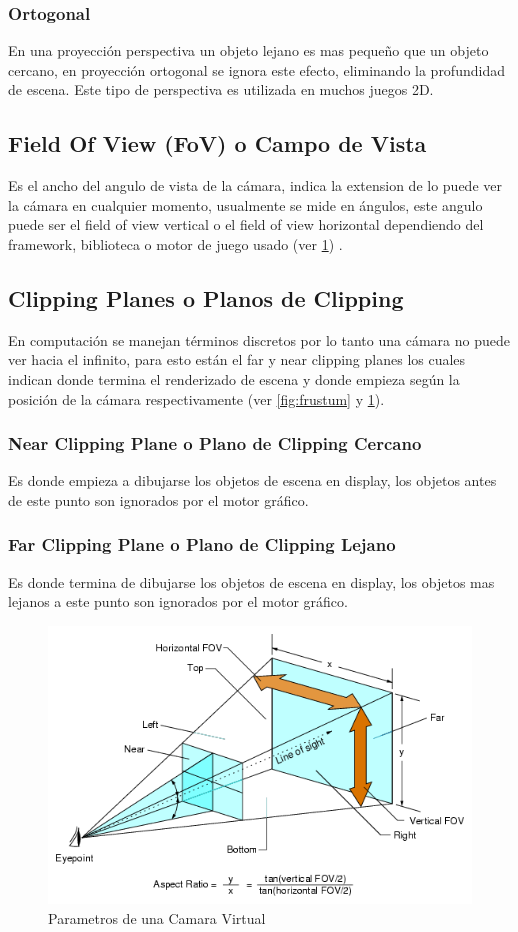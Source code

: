 \subsubsection{Ortogonal}
En una proyección perspectiva un objeto lejano es mas pequeño que un objeto cercano, en proyección ortogonal se ignora este efecto, eliminando la profundidad de escena. Este tipo de perspectiva es utilizada en muchos juegos 2D.
\subsection{Field Of View (FoV) o Campo de Vista}
Es el ancho del angulo de vista de la cámara, indica la extension de lo puede ver la cámara en cualquier momento, usualmente se mide en ángulos, este angulo puede ser el field of view vertical o el field of view horizontal dependiendo del framework, biblioteca o motor de juego usado (ver \ref{fig:camera}) \cite{feng_fovy}.
\subsection{Clipping Planes o Planos de Clipping}
En computación se manejan términos discretos por lo tanto una cámara no puede ver hacia el infinito, para esto están el far y near clipping planes los cuales indican donde termina el renderizado de escena y donde empieza según la posición de la cámara respectivamente (ver \ref{fig:frustum} y \ref{fig:camera}).
\subsubsection{Near Clipping Plane o Plano de Clipping Cercano}
Es donde empieza a dibujarse los objetos de escena en display, los objetos antes de este punto son ignorados por el motor gráfico.
\subsubsection{Far Clipping Plane o Plano de Clipping Lejano}
Es donde termina de dibujarse los objetos de escena en display, los objetos mas lejanos a este punto son ignorados por el motor gráfico.
\begin{figure}[H]
\centering
\includegraphics[width=0.9\linewidth]{semana2/camera.png} 
\caption{Parametros de una Camara Virtual}
\label{fig:camera}
\end{figure}
\newpage
